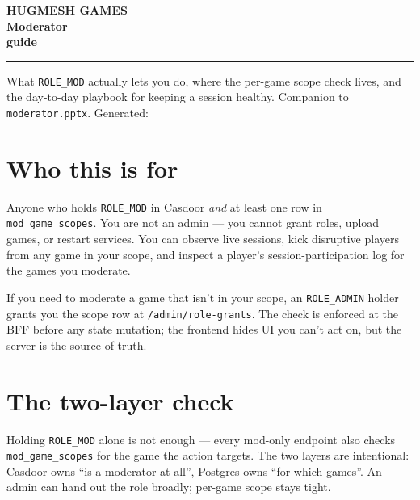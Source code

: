 \documentclass[11pt,a4paper,openany]{book}
\begin{document}
\begin{titlepage}\thispagestyle{empty}
\noindent{}
\vspace*{4cm}\noindent
{\sffamily\bfseries
  {\color{snapAccentTwo}\fontsize{18}{22}\selectfont HUGMESH GAMES}\\[3mm]
  {\color{white}\fontsize{42}{50}\selectfont Moderator\\guide}\par}
\vspace{1.5cm}\noindent\color{white!75!snapAccentTwo}\rule{0.4\linewidth}{1.2pt}
\vspace{0.8cm}\noindent
{\sffamily\color{white!85}\large
What \texttt{ROLE\_MOD} actually lets you do, where the per-game scope
check lives, and the day-to-day playbook for keeping a session healthy.}
\vfill\noindent
{\sffamily\color{white!70}\small
Companion to \texttt{moderator.pptx}. Generated: \snapbuilddate{} \snapbuildtime}
\end{titlepage}

\frontmatter\pagestyle{empty}\tableofcontents\clearpage
\mainmatter\pagestyle{fancy}

\chapter{Who this is for}
Anyone who holds \texttt{ROLE\_MOD} in Casdoor \emph{and} at least one
row in \texttt{mod\_game\_scopes}. You are not an admin --- you cannot
grant roles, upload games, or restart services. You can observe live
sessions, kick disruptive players from any game in your scope, and
inspect a player's session-participation log for the games you
moderate.

If you need to moderate a game that isn't in your scope, an
\texttt{ROLE\_ADMIN} holder grants you the scope row at
\texttt{/admin/role-grants}. The check is enforced at the BFF before
any state mutation; the frontend hides UI you can't act on, but the
server is the source of truth.

\chapter{The two-layer check}
Holding \texttt{ROLE\_MOD} alone is not enough --- every mod-only
endpoint also checks \texttt{mod\_game\_scopes} for the game the action
targets. The two layers are intentional: Casdoor owns ``is a moderator
at all'', Postgres owns ``for which games''. An admin can hand out the
role broadly; per-game scope stays tight.
\end{document}
